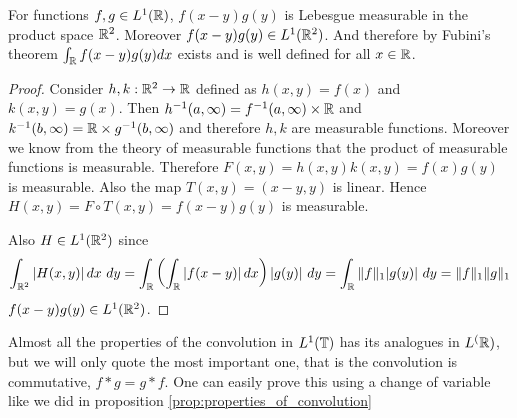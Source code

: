  \begin{proposition}
    For functions $f, g \in L^1(\mathbb R)$, $f(x-y)g(y)$ is Lebesgue measurable in the product space $\mathbb R^2$. Moreover $f(x-y)g(y) \in L^1(\mathbb R^2)$. And therefore by Fubini's theorem $\int_\mathbb R f(x-y)g(y) dx$ exists and is well defined for all $x \in \mathbb R$. 
  \end{proposition}
  \begin{proof}
    Consider $h, k : \mathbb R^2 \to \mathbb R$ defined as $h(x, y) = f(x)$ and $k(x, y) = g(x)$. Then $h^{-1}(a, \infty) = f^{-1}(a, \infty) \times \mathbb R$ and $k^{-1}(b, \infty) = \mathbb R \times g^{-1}(b, \infty)$ and therefore $h, k$ are measurable functions. Moreover we know from the theory of measurable functions that the product of measurable functions is measurable. Therefore $F(x, y) = h(x, y)k(x, y) = f(x)g(y)$ is measurable. Also the map $T(x, y) = (x-y, y)$ is linear. Hence $H(x, y) = F\circ T(x, y) = f(x-y)g(y)$ is measurable. 

    Also $H \in L^1(\mathbb R^2)$ since $$\int_{\mathbb R^2} \left|H(x, y)\right| dx \ dy  = \int_\mathbb R \left( \int_\mathbb R \left|f(x-y)\right| dx \right)|g(y)| \ dy = \int_\mathbb R \|f\|_1 |g(y)| \ dy = \|f\|_1\|g\|_1$$
    $f(x-y)g(y) \in L^1(\mathbb R^2)$.
    
  \end{proof}

  Almost all the properties of the convolution in $L^1(\mathbb T)$ has its analogues in $L^(\mathbb R)$, but we will only quote the most important one, that is the convolution is commutative, $f*g = g*f$. One can easily prove this using a change of variable like we did in proposition \ref{prop:properties_of_convolution}

